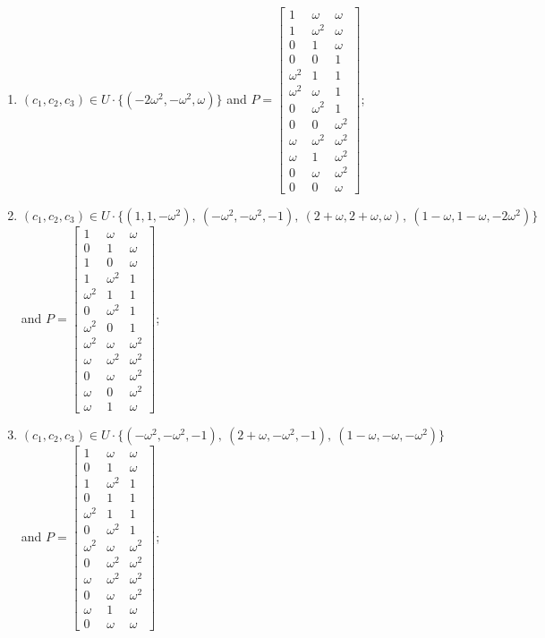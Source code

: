 \begin{enumerate}
\item[(f62)\,\newitem] $(c_1,c_2,c_3)\in U\cdot\{(-2\omega^2,-\omega^2,\omega)\}$ and $P=\begin{bmatrix}1&\omega&\omega\\1&\omega^2&\omega\\0&1&\omega\\0&0&1\\\omega^2&1&1\\\omega^2&\omega&1\\0&\omega^2&1\\0&0&\omega^2\\\omega&\omega^2&\omega^2\\\omega&1&\omega^2\\0&\omega&\omega^2\\0&0&\omega\end{bmatrix}$;
\item[(f63)\,\newitem] $(c_1,c_2,c_3)\in U\cdot\{(1,1,-\omega^2),\allowbreak\ (-\omega^2,-\omega^2,-1),\allowbreak\ (2+\omega,2+\omega,\omega),\allowbreak\ (1-\omega,1-\omega,-2\omega^2)\}$ and $P=\begin{bmatrix}1&\omega&\omega\\0&1&\omega\\1&0&\omega\\1&\omega^2&1\\\omega^2&1&1\\0&\omega^2&1\\\omega^2&0&1\\\omega^2&\omega&\omega^2\\\omega&\omega^2&\omega^2\\0&\omega&\omega^2\\\omega&0&\omega^2\\\omega&1&\omega\end{bmatrix}$;
\item[(f64)\,\newitem] $(c_1,c_2,c_3)\in U\cdot\{(-\omega^2,-\omega^2,-1),\allowbreak\ (2+\omega,-\omega^2,-1),\allowbreak\ (1-\omega,-\omega,-\omega^2)\}$ and $P=\begin{bmatrix}1&\omega&\omega\\0&1&\omega\\1&\omega^2&1\\0&1&1\\\omega^2&1&1\\0&\omega^2&1\\\omega^2&\omega&\omega^2\\0&\omega^2&\omega^2\\\omega&\omega^2&\omega^2\\0&\omega&\omega^2\\\omega&1&\omega\\0&\omega&\omega\end{bmatrix}$;

\end{enumerate}
